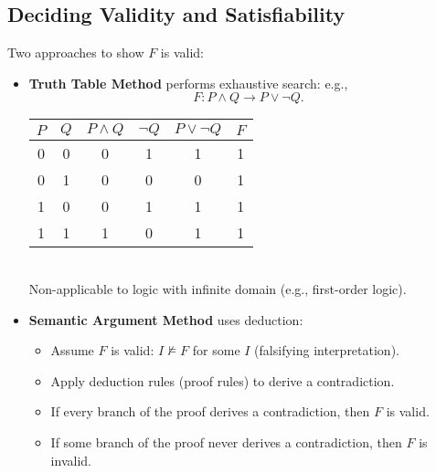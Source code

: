 \newpage
\subsection{Deciding Validity and Satisfiability}
Two approaches to show $F$ is valid:
\begin{itemize}
	\item \textbf{Truth Table Method} performs exhaustive search: e.g., \[
	F:P\land Q\to P\lor\lnot Q.
	\]
	\begin{table}[h!]\centering
		\begin{tabular}{c|c|c|c|c||c}
			\hline
			$P$ & $Q$ & $P\land Q$ & $\lnot Q$ & $P\lor\lnot Q$ & $F$ \\ \hline
			0 & 0 & 0 & 1 & 1 & 1 \\
			0 & 1 & 0 & 0 & 0 & 1 \\
			1 & 0 & 0 & 1 & 1 & 1 \\
			1 & 1 & 1 & 0 & 1 & 1 \\ \hline
		\end{tabular}
	\end{table} \\
	Non-applicable to logic with infinite domain (e.g., first-order logic).
	\item \textbf{Semantic Argument Method} uses deduction:
	\begin{itemize}
		\item Assume $F$ is valid: $I\not\models F$ for some $I$ (falsifying interpretation).
		\item Apply deduction rules (proof rules) to derive a contradiction.
		\item If every branch of the proof derives a contradiction, then $F$ is valid.
		\item If some branch of the proof never derives a contradiction, then $F$ is invalid.
	\end{itemize}
\end{itemize}

